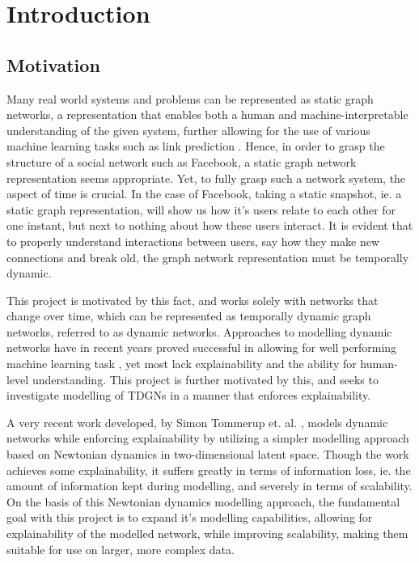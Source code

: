 \section{Introduction}
\label{sec:Intro}


\subsection{Motivation}
\label{sec:Intro:Motivation}
Many real world systems and problems can be represented as static graph networks, a representation that enables both a human and machine-interpretable understanding of the given system, further allowing for the use of various machine learning tasks such as link prediction \cite{GroverNode2vec:Networks} \cite{Hamilton2017RepresentationApplications}.
Hence, in order to grasp the structure of a social network such as Facebook, a static graph network representation seems appropriate.
Yet, to fully grasp such a network system, the aspect of time is crucial.
In the case of Facebook, taking a static snapshot, ie. a static graph representation, will show us how it's users relate to each other for one instant, but next to nothing about how these users interact.
It is evident that to properly understand interactions between users, say how they make new connections and break old, the graph network representation must be temporally dynamic.

This project is motivated by this fact, and works solely with networks that change over time, which can be represented as temporally dynamic graph networks, referred to as dynamic networks.
Approaches to modelling dynamic networks have in recent years proved successful in allowing for well performing machine learning task \cite{Xu2020INDUCTIVEGRAPHS} \cite{Trivedi2019DYREP:GRAPHS} \cite{Rossi2020TEMPORALGRAPHS}, yet most lack explainability and the ability for human-level understanding.
This project is further motivated by this, and seeks to investigate modelling of TDGNs in a manner that enforces explainability. 

A very recent work developed, by Simon Tommerup et. al. \cite{Tommerup2021LearningNetworks}, models dynamic networks while enforcing explainability by utilizing a simpler modelling approach based on Newtonian dynamics in two-dimensional latent space.
Though the work achieves some explainability, it suffers greatly in terms of information loss, ie. the amount of information kept during modelling, and severely in terms of scalability.
On the basis of this Newtonian dynamics modelling approach, the fundamental goal with this project is to expand it's modelling capabilities, allowing for explainability of the modelled network, while improving scalability, making them suitable for use on larger, more complex data.



